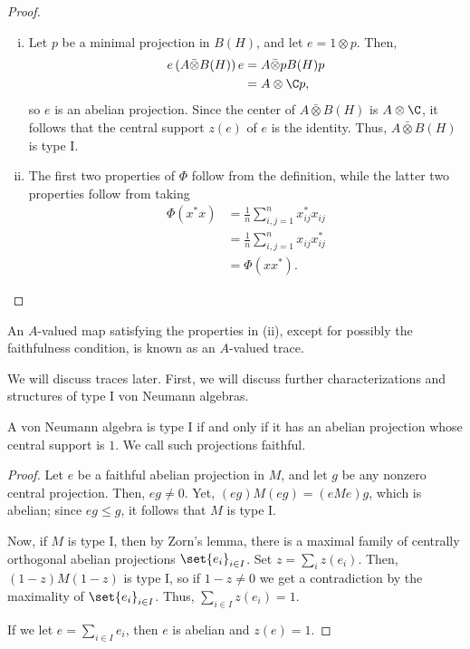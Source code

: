 \documentclass[10pt]{mypackage}
\begin{document}
\begin{proof}\hfill
  \begin{enumerate}[(i)]
    \item Let $p$ be a minimal projection in $B(H)$, and let $e = 1\otimes p$. Then,
      \begin{align*}
        e\left( A\bar\otimes B(H) \right)e &= A\bar\otimes pB(H)p\\
                                           &= A\otimes \C p,
      \end{align*}
      so $e$ is an abelian projection. Since the center of $A\bar\otimes B(H)$ is $A\otimes \C$, it follows that the central support $z(e)$ of $e$ is the identity. Thus, $A\bar\otimes B(H)$ is type I.
    \item The first two properties of $\Phi$ follow from the definition, while the latter two properties follow from taking
      \begin{align*}
        \Phi\left( x^{\ast}x \right) &= \frac{1}{n}\sum_{i,j=1}^{n}x_{ij}^{\ast}x_{ij}\\
                                     &= \frac{1}{n}\sum_{i,j=1}^{n} x_{ij}x_{ij}^{\ast}\\
                                     &= \Phi\left( xx^{\ast} \right).
      \end{align*}
  \end{enumerate}
\end{proof}
\begin{definition}
  An $A$-valued map satisfying the properties in (ii), except for possibly the faithfulness condition, is known as an $A$-valued trace.
\end{definition}
We will discuss traces later. First, we will discuss further characterizations and structures of type I von Neumann algebras.
\begin{proposition}
  A von Neumann algebra is type I if and only if it has an abelian projection whose central support is $1$. We call such projections faithful.
\end{proposition}
\begin{proof}
  Let $e$ be a faithful abelian projection in $M$, and let $g$ be any nonzero central projection. Then, $eg\neq 0$. Yet, $\left( eg \right)M\left( eg \right) = \left( eMe \right)g$, which is abelian; since $eg\leq g$, it follows that $M$ is type I.

  Now, if $M$ is type I, then by Zorn's lemma, there is a maximal family of centrally orthogonal abelian projections $\set{e_i}_{i\in I}$. Set $z = \sum_{i}z\left( e_i \right)$. Then, $\left( 1-z \right)M\left( 1-z \right)$ is type I, so if $1-z\neq 0$ we get a contradiction by the maximality of $\set{e_i}_{i\in I}$. Thus, $\sum_{i\in I}z\left( e_i \right) = 1$.

  If we let $e = \sum_{i\in I}e_i$, then $e$ is abelian and $z\left( e \right) = 1$.
\end{proof}
\end{document}
